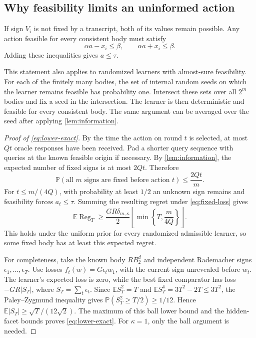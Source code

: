 \documentclass[11pt]{article}
\newcommand{\E}{\mathbb E}
\newcommand{\Prob}{\mathbb P}
\newcommand{\Reg}{\operatorname{Reg}}
\theoremstyle{definition}
\begin{document}
\subsection{Why feasibility limits an uninformed action}

If sign $V_i$ is not fixed by a transcript, both of its values remain
possible. Any action feasible for every consistent body must satisfy
\[
 \alpha a-x_i\le\beta,
 \qquad \alpha a+x_i\le\beta.
\]
Adding these inequalities gives $a\le\tau$.

This statement also applies to randomized learners with almost-sure
feasibility. For each of the finitely many bodies, the set of internal
random seeds on which the learner remains feasible has probability one.
Intersect these sets over all $2^m$ bodies and fix a seed in the
intersection. The learner is then deterministic and feasible for every
consistent body. The same argument can be averaged over the seed after
applying \cref{lem:information}.

\begin{proof}[Proof of \eqref{eq:lower-exact}]
By the time the action on round $t$ is selected, at most $Qt$ oracle
responses have been received. Pad a shorter query sequence with queries
at the known feasible origin if necessary. By
\cref{lem:information}, the expected number of fixed signs is at most
$2Qt$. Therefore
\[
 \Prob(\text{all $m$ signs are fixed before action $t$})\le\frac{2Qt}{m}.
\]
For $t\le m/(4Q)$, with probability at least $1/2$ an unknown sign remains
and feasibility forces $a_t\le\tau$. Summing the resulting regret under
\eqref{eq:fixed-loss} gives
\[
 \E\Reg_T\ge\frac{GR\delta_{m,\kappa}}2
 \left\lfloor\min\left\{T,\frac{m}{4Q}\right\}\right\rfloor.
\]
This holds under the uniform prior for every randomized admissible learner,
so some fixed body has at least this expected regret.

For completeness, take the known body $RB_2^d$ and independent Rademacher
signs $\epsilon_1,\ldots,\epsilon_T$. Use losses
$f_t(w)=G\epsilon_t w_1$, with the current sign unrevealed before $w_t$.
The learner's expected loss is zero, while the best fixed comparator has
loss $-GR|S_T|$, where $S_T=\sum_t\epsilon_t$.
Since $\E S_T^2=T$ and $\E S_T^4=3T^2-2T\le3T^2$, the
Paley--Zygmund inequality gives
$\Prob(S_T^2\ge T/2)\ge1/12$. Hence
$\E|S_T|\ge\sqrt T/(12\sqrt2)$.
The maximum of this ball lower bound and the hidden-facet bounds proves
\eqref{eq:lower-exact}. For $\kappa=1$, only the ball argument is needed.
\end{proof}
\end{document}
